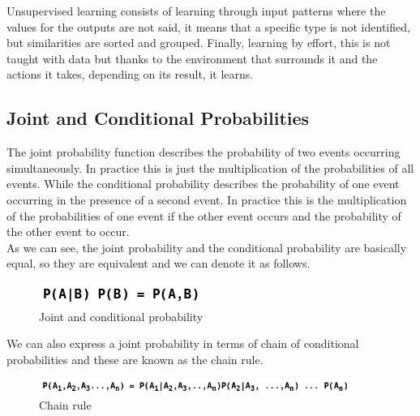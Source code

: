 \documentclass[sigconf,12pt,review=false,natbib=false]{acmart}
\begin{document}
Unsupervised learning consists of learning through input patterns where the values for the outputs are not said,
it means that a specific type is not identified, but similarities are sorted and grouped. 
Finally, learning by effort, this is not taught with data but thanks to the environment that surrounds it and the
actions it takes, depending on its result, it learns. \\

\subsection{Joint and Conditional Probabilities}

The joint probability function describes the probability of two events occurring simultaneously. In
practice this is just the multiplication of the probabilities of all events. While the conditional
probability describes the probability of one event occurring in the presence of a second event. In
practice this is the multiplication of the probabilities of one event if the other event occurs and
the probability of the other event to occur. \\

As we can see, the joint probability and the conditional probability are basically equal, so they are
equivalent and we can denote it as follows. \\

\begin{figure}[h!]
    \centering
    \includegraphics[]{jcp_relationship}
    \caption{Joint and conditional probability}
    \label{fig:jcp_relationship}
\end{figure}

We can also express a joint probability in terms of chain of conditional probabilities and these are
known as the chain rule. \\

\begin{figure}[h!]
    \centering
    \includegraphics[width=4in]{chain_rule}
    \caption{Chain rule}
    \label{fig:jcp_relationship}
\end{figure}
\end{document}
